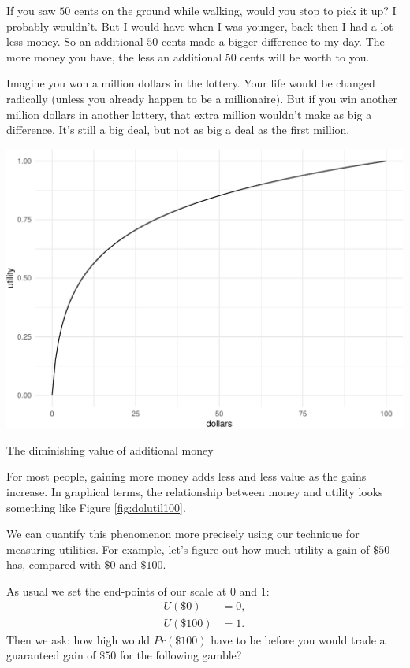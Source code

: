 \documentclass[justified]{tufte-book}
\renewcommand{\u}{U}
\newcommand{\p}{Pr}
\theoremstyle{definition}
\theoremstyle{definition}
\theoremstyle{definition}
\theoremstyle{definition}
\theoremstyle{remark}
\begin{document}
If you saw \(50\) cents on the ground while walking, would you stop to pick it up? I probably wouldn't. But I would have when I was younger, back then I had a lot less money. So an additional \(50\) cents made a bigger difference to my day. The more money you have, the less an additional \(50\) cents will be worth to you.

Imagine you won a million dollars in the lottery. Your life would be changed radically (unless you already happen to be a millionaire). But if you win another million dollars in another lottery, that extra million wouldn't make as big a difference. It's still a big deal, but not as big a deal as the first million.

\begin{marginfigure}
\includegraphics{_main_files/figure-latex/dolutil100-1} \caption[The diminishing value of additional money]{The diminishing value of additional money}\label{fig:dolutil100}
\end{marginfigure}

For most people, gaining more money adds less and less value as the gains increase. In graphical terms, the relationship between money and utility looks something like Figure \ref{fig:dolutil100}.

We can quantify this phenomenon more precisely using our technique for measuring utilities. For example, let's figure out how much utility a gain of \(\$50\) has, compared with \(\$0\) and \(\$100\).

As usual we set the end-points of our scale at \(0\) and \(1\):
\[
  \begin{aligned}
    \u(\$0)   &= 0,\\
    \u(\$100) &= 1.
  \end{aligned}
\]
Then we ask: how high would \(\p(\$100)\) have to be before you would trade a guaranteed gain of \(\$50\) for the following gamble?
\end{document}
